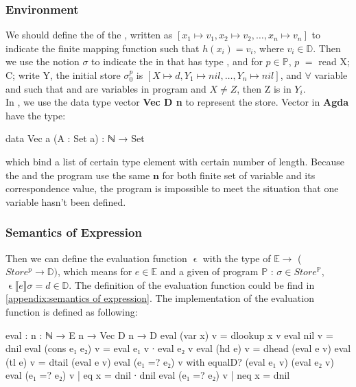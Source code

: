 \subsubsection{Environment}
We should define the  of the , written as $[x_1 \mapsto v_1, x_2 \mapsto v_2, \dots,x_n \mapsto v_n]$ to indicate the finite mapping function such that $h(x_i) = v_i$, where $v_i \in \mathds{D}$.
Then we use the notion $\sigma$ to indicate the  in \WHILE that has type ,
and for $p \in \mathds{P}$, $p$ $=$ read X; C; write Y, the initial store $\sigma_0^p$ is $[X \mapsto d, Y_1 \mapsto nil, \dots,Y_n \mapsto nil]$, and $\forall$ variable  and  such that  and  are variables in program  and $X \neq Z$, then Z is in $Y_i$.\\
In \Agda, we use the data type vector \textbf{Vec D n} to represent the store. Vector in \textbf{Agda} have the type:
\begin{code}
data Vec {a} (A : Set a) : ℕ → Set
\end{code}
which bind a list of certain type element with certain number of length.
Because the  and the program use the same $\textbf{n}$ for both finite set of variable and its correspondence value,
the program is impossible to meet the situation that one variable hasn't been defined.
\subsubsection{Semantics of Expression}
Then we can define the evaluation function $\upvarepsilon$ with the type of $\mathds{E} \longrightarrow $ ($Store^p \rightarrow \mathds{D})$, 
which means for $e \in \mathds{E}$ and a given  of program $\mathds{P}$ : $\sigma \in Store^{\mathds{P}}$, $\upvarepsilon \llbracket e \rrbracket \sigma = d \in \mathds{D}$.
The definition of the evaluation function could be find in \ref{appendix:semantics of expression}.
The \Agda implementation of the evaluation function is defined as following:
\begin{code}[fontsize=\footnotesize]
eval : {n : ℕ} → E n → Vec D n → D
eval (var x) v = dlookup x v
eval nil v = dnil
eval (cons e₁ e₂) v = eval e₁ v ∙ eval e₂ v
eval (hd e) v = dhead (eval e v)
eval (tl e) v = dtail (eval e v)
eval (e₁ =? e₂) v with equalD? (eval e₁ v) (eval e₂ v)
eval (e₁ =? e₂) v | eq x = dnil ∙ dnil
eval (e₁ =? e₂) v | neq x = dnil
\end{code}
